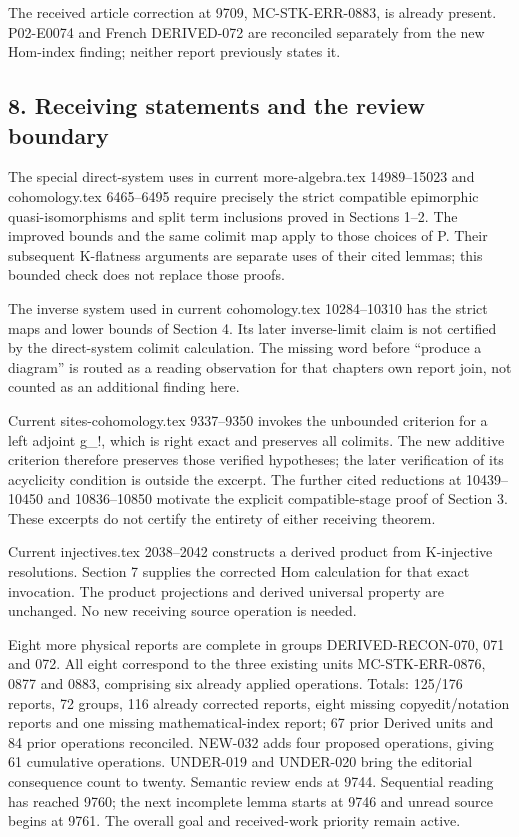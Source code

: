 The received article correction at 9709,\allowbreak{} MC-STK-ERR-0883,\allowbreak{} is already present. P02-E0074 and French DERIVED-072 are reconciled separately from the new Hom-index finding; neither report previously states it.

\subsection{8. Receiving statements and the review boundary}\label{proofs-9206-9744-receiving-statements-and-the-review-boundary}

The special direct-system uses in current more-algebra.tex 14989–\allowbreak{}15023 and cohomology.tex 6465–\allowbreak{}6495 require precisely the strict compatible epimorphic quasi-isomorphisms and split term inclusions proved in Sections 1–\allowbreak{}2. The improved bounds and the same colimit map apply to those choices of P. Their subsequent K-flatness arguments are separate uses of their cited lemmas; this bounded check does not replace those proofs.

The inverse system used in current cohomology.tex 10284–\allowbreak{}10310 has the strict maps and lower bounds of Section 4. Its later inverse-limit claim is not certified by the direct-system colimit calculation. The missing word before ``produce a diagram'' is routed as a reading observation for that chapter\textquotesingle s own report join,\allowbreak{} not counted as an additional finding here.

Current sites-cohomology.tex 9337–\allowbreak{}9350 invokes the unbounded criterion for a left adjoint g\_\allowbreak{}!,\allowbreak{} which is right exact and preserves all colimits. The new additive criterion therefore preserves those verified hypotheses; the later verification of its acyclicity condition is outside the excerpt. The further cited reductions at 10439–\allowbreak{}10450 and 10836–\allowbreak{}10850 motivate the explicit compatible-stage proof of Section 3. These excerpts do not certify the entirety of either receiving theorem.

Current injectives.tex 2038–\allowbreak{}2042 constructs a derived product from K-injective resolutions. Section 7 supplies the corrected Hom calculation for that exact invocation. The product projections and derived universal property are unchanged. No new receiving source operation is needed.

Eight more physical reports are complete in groups DERIVED-RECON-070,\allowbreak{} 071 and 072. All eight correspond to the three existing units MC-STK-ERR-0876,\allowbreak{} 0877 and 0883,\allowbreak{} comprising six already applied operations. Totals:\allowbreak{} 125/\allowbreak{}176 reports,\allowbreak{} 72 groups,\allowbreak{} 116 already corrected reports,\allowbreak{} eight missing copyedit/\allowbreak{}notation reports and one missing mathematical-index report; 67 prior Derived units and 84 prior operations reconciled. NEW-032 adds four proposed operations,\allowbreak{} giving 61 cumulative operations. UNDER-019 and UNDER-020 bring the editorial consequence count to twenty. Semantic review ends at 9744. Sequential reading has reached 9760; the next incomplete lemma starts at 9746 and unread source begins at 9761. The overall goal and received-work priority remain active.
